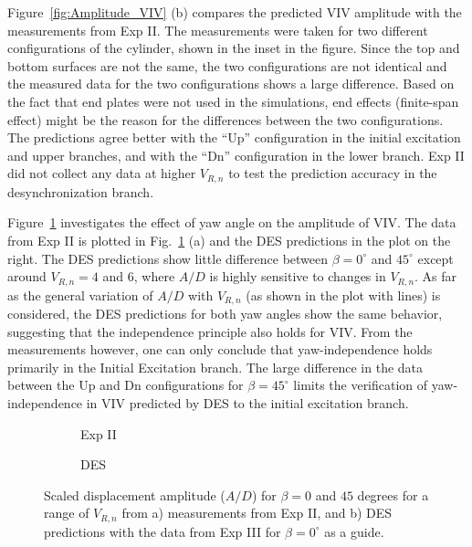 Figure~\ref{fig:Amplitude_VIV} (b) compares the predicted VIV amplitude with
the measurements from Exp II. The measurements were taken for two different
configurations of the cylinder, shown in the inset in the figure. Since the top
and bottom surfaces are not the same, the two configurations are not identical
and the measured data for the two configurations shows a large difference.
Based on the fact that end plates were not used in the simulations, end effects
(finite-span effect) might be the reason for the differences between the two
configurations.  The predictions agree better with the ``Up'' configuration in
the initial excitation and upper branches, and with the ``Dn'' configuration in
the lower branch. Exp II did not collect any data at higher $V_{R,n}$ to test
the prediction accuracy in the desynchronization branch.

Figure~\ref{fig:VIV_yaw} investigates the effect of yaw angle on the amplitude
of VIV. The data from Exp II is plotted in Fig.~\ref{fig:VIV_yaw} (a) and the
DES predictions in the plot on the right.  The DES predictions show little
difference between $\beta=0^\circ$ and $45^\circ$ except around $V_{R,n}=4$ and
$6$, where $A/D$ is highly sensitive to changes in $V_{R,n}$. As far as the
general variation of $A/D$ with $V_{R,n}$ (as shown in the plot with lines) is
considered, the DES predictions for both yaw angles show the same behavior,
suggesting that the independence principle also holds for VIV. From the
measurements however, one can only conclude that yaw-independence holds
primarily in the Initial Excitation branch. The large difference in the data
between the Up and Dn configurations for $\beta=45^\circ$ limits the
verification of yaw-independence in VIV predicted by DES to the initial
excitation branch.
%
\begin{figure}[htb!]
  \centering
  \begin{subfigure}[b]{.5\linewidth}
    \caption{Exp II}
  \end{subfigure}
  \begin{subfigure}[b]{.5\linewidth}
    \caption{DES}
  \end{subfigure}
  \caption{Scaled displacement amplitude ($A/D$) for $\beta=0$ and $45$ degrees
    for a range of $V_{R,n}$ from a) measurements from Exp II, and b) DES
    predictions with the data from Exp III for $\beta=0^\circ$ as a guide.}
  \label{fig:VIV_yaw}
\end{figure}

